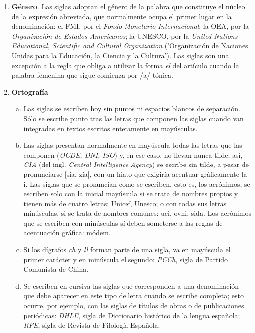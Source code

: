\begin{enumerate}[1)]
	\item \textbf{G\'enero}. Las siglas adoptan el g\'enero de la palabra que constituye el n\'ucleo de la expresi\'on abreviada, que normalmente ocupa el primer lugar en la denominaci\'on: el FMI, por el \textit{Fondo Monetario Internacional}; la OEA, por la \textit{Organizaci\'on de Estados Americanos}; la UNESCO, por la \textit{United Nations Educational, Scientific and Cultural Organization} ('Organizaci\'on de Naciones Unidas para la Educaci\'on, la Ciencia y la Cultura'). Las siglas son una excepci\'on a la regla que obliga a utilizar la forma \textit{el} del art\'iculo cuando la palabra femenina que sigue comienza por /a/ t\'onica.

	\item \textbf{Ortograf\'ia}
		\begin{enumerate}[a)]
		\item {Las siglas se escriben hoy sin puntos ni espacios blancos de separaci\'on. S\'olo se escribe punto tras las letras que componen las siglas cuando van integradas en textos escritos enteramente en may\'usculas.}

		\item {Las siglas presentan normalmente en may\'uscula todas las letras que las componen (\textit{OCDE, DNI, ISO}) y, en ese caso, no llevan nunca tilde; as\'i, \textit{CIA} (del ingl. \textit{Central Intelligence Agency}) se escribe sin tilde, a pesar de pronunciarse [s\'ia, z\'ia], con un hiato que exigir\'ia acentuar gr\'aficamente la i. Las siglas que se pronuncian como se escriben, esto es, los acr\'onimos, se escriben solo con la inicial may\'uscula si se trata de nombres propios y tienen m\'as de cuatro letras: Unicef, Unesco; o con todas sus letras min\'usculas, si se trata de nombres comunes: uci, ovni, sida. Los acr\'onimos que se escriben con min\'usculas sí deben someterse a las reglas de acentuaci\'on gr\'afica: m\'odem.}

		\item {Si los d\'igrafos \textit{ch} y \textit{ll} forman parte de una sigla, va en may\'uscula el primer car\'acter y en min\'uscula el segundo: \textit{PCCh}, sigla de Partido Comunista de China.}

		\item {Se escriben en cursiva las siglas que corresponden a una denominaci\'on que debe aparecer en este tipo de letra cuando se escribe completa; esto ocurre, por ejemplo, con las siglas de t\'itulos de obras o de publicaciones peri\'odicas: \textit{DHLE}, sigla de Diccionario hist\'orico de la lengua espa\~nola; \textit{RFE}, sigla de Revista de Filolog\'ia Espa\~nola.}


\end{enumerate}
\end{enumerate}
